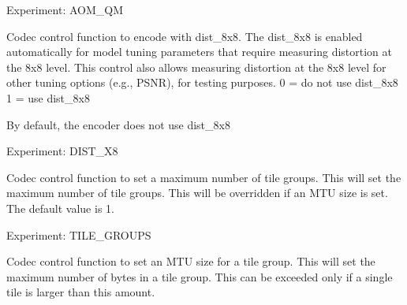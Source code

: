 \begin{Desc}
\begin{description}
Experiment\+: A\+O\+M\+\_\+\+QM \item[{\em 
A\+V1\+E\+\_\+\+S\+E\+T\+\_\+\+E\+N\+A\+B\+L\+E\+\_\+\+D\+I\+S\+T\+\_\+8\+X8\hypertarget{group__aom__encoder_ggae78dde67a6d78f332e9bdba0dde42db5a7ef16c780349c5fee8281f1e5b4a6718}{}\label{group__aom__encoder_ggae78dde67a6d78f332e9bdba0dde42db5a7ef16c780349c5fee8281f1e5b4a6718}
}]Codec control function to encode with dist\+\_\+8x8. The dist\+\_\+8x8 is enabled automatically for model tuning parameters that require measuring distortion at the 8x8 level. This control also allows measuring distortion at the 8x8 level for other tuning options (e.\+g., P\+S\+NR), for testing purposes. 0 = do not use dist\+\_\+8x8 1 = use dist\+\_\+8x8

By default, the encoder does not use dist\+\_\+8x8

Experiment\+: D\+I\+S\+T\+\_\+X8 \item[{\em 
A\+V1\+E\+\_\+\+S\+E\+T\+\_\+\+N\+U\+M\+\_\+\+TG\hypertarget{group__aom__encoder_ggae78dde67a6d78f332e9bdba0dde42db5a9ac0044ad63e6848a482db04f0858c44}{}\label{group__aom__encoder_ggae78dde67a6d78f332e9bdba0dde42db5a9ac0044ad63e6848a482db04f0858c44}
}]Codec control function to set a maximum number of tile groups. This will set the maximum number of tile groups. This will be overridden if an M\+TU size is set. The default value is 1.

Experiment\+: T\+I\+L\+E\+\_\+\+G\+R\+O\+U\+PS \item[{\em 
A\+V1\+E\+\_\+\+S\+E\+T\+\_\+\+M\+TU\hypertarget{group__aom__encoder_ggae78dde67a6d78f332e9bdba0dde42db5a353037d84b6c47ac0138fa843b70a2bb}{}\label{group__aom__encoder_ggae78dde67a6d78f332e9bdba0dde42db5a353037d84b6c47ac0138fa843b70a2bb}
}]Codec control function to set an M\+TU size for a tile group. This will set the maximum number of bytes in a tile group. This can be exceeded only if a single tile is larger than this amount.


\end{description}
\end{Desc}
